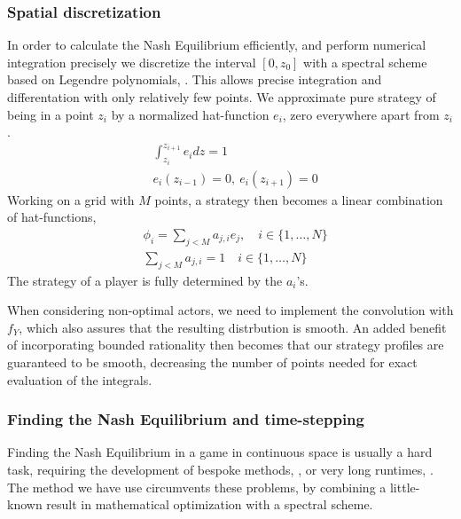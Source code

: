 \subsubsection*{Spatial discretization}
In order to calculate the Nash Equilibrium efficiently, and perform numerical integration precisely we discretize the interval $[0,z_0]$ with a spectral scheme based on Legendre polynomials, \citep{kopriva2009implementing}. This allows precise integration and differentation with only relatively few points.
We approximate pure strategy of being in a point $z_i$  by a normalized hat-function $e_i$, zero everywhere apart from $z_i$.
\begin{align*}
	& \int_{z_i}^{z_{i+1}} e_i dz = 1 \\
	&e_i(z_{i-1}) = 0,~ e_i(z_{i+1}) = 0
\end{align*}
Working on a grid with $M$ points, a strategy then becomes a linear combination of hat-functions,
\begin{align*}
  &\phi_{i} = \sum_{j<M} a_{j,i} e_j, \quad i\in \{1,\dots, N\} \\
  &\sum_{j<M} a_{j,i} = 1 \quad i\in \{1,\dots, N\}
\end{align*}
The strategy of a player is fully determined by the $a_i$'s.

When considering non-optimal actors, we need to implement the convolution with $f_Y$, which also assures that the resulting distrbution is smooth. An added benefit of incorporating bounded rationality then becomes that our strategy profiles are guaranteed to be smooth, decreasing the number of points needed for exact evaluation of the integrals.


\subsubsection*{Finding the Nash Equilibrium and time-stepping}
Finding the Nash Equilibrium in a game in continuous space is usually a hard task, requiring the development of bespoke methods, \citep{verticalmigration}, or very long runtimes, \citep{jerome}. The method we have use circumvents these problems, by combining a little-known result in mathematical optimization with a spectral scheme.

